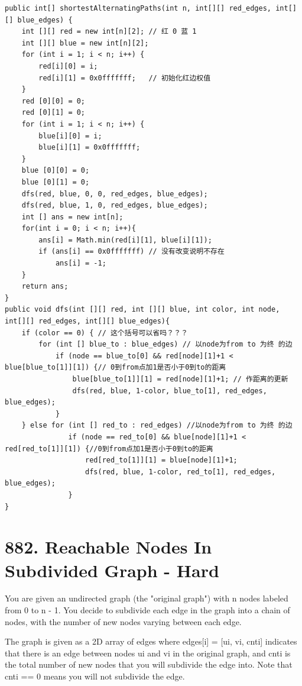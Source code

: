 \documentclass[9pt, b5paaper]{book}
\begin{document}
\begin{verbatim}
public int[] shortestAlternatingPaths(int n, int[][] red_edges, int[][] blue_edges) {
    int [][] red = new int[n][2]; // 红 0 蓝 1
    int [][] blue = new int[n][2];
    for (int i = 1; i < n; i++) {
        red[i][0] = i;
        red[i][1] = 0x0fffffff;   // 初始化红边权值
    }
    red [0][0] = 0;
    red [0][1] = 0;
    for (int i = 1; i < n; i++) {
        blue[i][0] = i;
        blue[i][1] = 0x0fffffff;
    }
    blue [0][0] = 0;
    blue [0][1] = 0;
    dfs(red, blue, 0, 0, red_edges, blue_edges);
    dfs(red, blue, 1, 0, red_edges, blue_edges);
    int [] ans = new int[n];
    for(int i = 0; i < n; i++){
        ans[i] = Math.min(red[i][1], blue[i][1]);
        if (ans[i] == 0x0fffffff) // 没有改变说明不存在
            ans[i] = -1;
    }
    return ans;
}
public void dfs(int [][] red, int [][] blue, int color, int node, int[][] red_edges, int[][] blue_edges){
    if (color == 0) { // 这个括号可以省吗？？？
        for (int [] blue_to : blue_edges) // 以node为from to 为终 的边
            if (node == blue_to[0] && red[node][1]+1 < blue[blue_to[1]][1]) {// 0到from点加1是否小于0到to的距离
                blue[blue_to[1]][1] = red[node][1]+1; // 作距离的更新
                dfs(red, blue, 1-color, blue_to[1], red_edges, blue_edges);
            }
    } else for (int [] red_to : red_edges) //以node为from to 为终 的边
               if (node == red_to[0] && blue[node][1]+1 < red[red_to[1]][1]) {//0到from点加1是否小于0到to的距离
                   red[red_to[1]][1] = blue[node][1]+1;
                   dfs(red, blue, 1-color, red_to[1], red_edges, blue_edges);
               }
}
\end{verbatim}

\section{882. Reachable Nodes In Subdivided Graph - Hard}
\label{sec-7-4}
You are given an undirected graph (the "original graph") with n nodes labeled from 0 to n - 1. You decide to subdivide each edge in the graph into a chain of nodes, with the number of new nodes varying between each edge.

The graph is given as a 2D array of edges where edges[i] = [ui, vi, cnti] indicates that there is an edge between nodes ui and vi in the original graph, and cnti is the total number of new nodes that you will subdivide the edge into. Note that cnti == 0 means you will not subdivide the edge.
\end{document}
